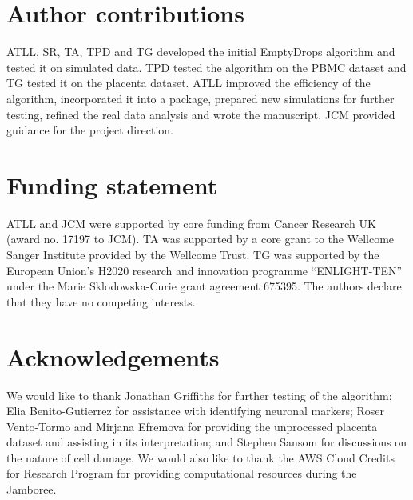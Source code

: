 \documentclass[10pt,letterpaper]{article}
\begin{document}
\section*{Author contributions}
ATLL, SR, TA, TPD and TG developed the initial EmptyDrops algorithm and tested it on simulated data.
TPD tested the algorithm on the PBMC dataset and TG tested it on the placenta dataset.
ATLL improved the efficiency of the algorithm, incorporated it into a package, prepared new simulations for further testing, refined the real data analysis and wrote the manuscript.
JCM provided guidance for the project direction. 

\section*{Funding statement}
ATLL and JCM were supported by core funding from Cancer Research UK (award no. 17197 to JCM).
TA was supported by a core grant to the Wellcome Sanger Institute provided by the Wellcome Trust.
TG was supported by the European Union's H2020 research and innovation programme ``ENLIGHT-TEN'' under the Marie Sklodowska-Curie grant agreement 675395.
The authors declare that they have no competing interests.

\section*{Acknowledgements}
We would like to thank Jonathan Griffiths for further testing of the algorithm;
Elia Benito-Gutierrez for assistance with identifying neuronal markers;
Roser Vento-Tormo and Mirjana Efremova for providing the unprocessed placenta dataset and assisting in its interpretation;
and Stephen Sansom for discussions on the nature of cell damage.
We would also like to thank the AWS Cloud Credits for Research Program for providing computational resources during the Jamboree.



\end{document}
